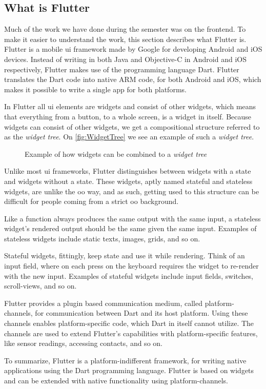 \subsection{What is Flutter}

Much of the work we have done during the semester was on the frontend. To make it easier to understand the work, this section describes what Flutter is. Flutter is a mobile \gls{ui} framework made by Google for developing Android and iOS devices\cite{flutterFAQ}. Instead of writing in both Java and Objective-C in Android and iOS respectively, Flutter makes use of the programming language Dart. Flutter translates the Dart code into native ARM code, for both Android and iOS, which makes it possible to write a single app for both platforms. 

In Flutter all \gls{ui} elements are widgets and consist of other widgets, which means that everything from a button, to a whole screen, is a widget in itself. Because widgets can consist of other widgets, we get a compositional structure referred to as the \textit{widget tree}. On \autoref{fig:WidgetTree} we see an example of such a \textit{widget tree}.

\begin{figure}[h]
    \centering
    \caption{Example of how widgets can be combined to a \textit{widget tree}}
    \label{fig:WidgetTree}
\end{figure}

Unlike most \gls{ui} frameworks, Flutter distinguishes between widgets with a state and widgets without a state. These widgets, aptly named stateful and stateless widgets, are unlike the \gls{oo} way, and as such, getting used to this structure can be difficult for people coming from a strict \gls{oo} background.

Like a function always produces the same output with the same input, a stateless widget's rendered output should be the same given the same input. Examples of stateless widgets include static texts, images, grids, and so on. 

Stateful widgets, fittingly, keep state and use it while rendering. Think of an input field, where on each press on the keyboard requires the widget to re-render with the new input. Examples of stateful widgets include input fields, switches, scroll-views, and so on.

Flutter provides a plugin based communication medium, called platform-channels, for communication between Dart and its host platform\cite{flutter_plugins}. Using these channels enables platform-specific code, which Dart in itself cannot utilize. The channels are used to extend Flutter's capabilities with platform-specific features, like sensor readings, accessing contacts, and so on.

To summarize, Flutter is a platform-indifferent framework, for writing native applications using the Dart programming language. Flutter is based on widgets and can be extended with native functionality using platform-channels.
